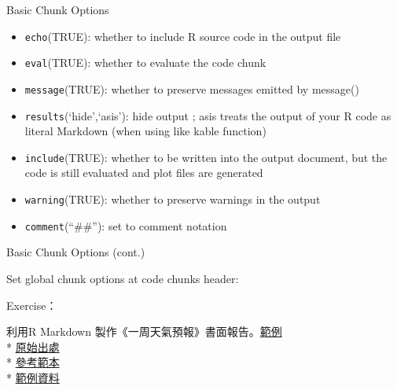 \documentclass[ignorenonframetext,]{beamer}
\newenvironment{Shaded}{\begin{snugshade}}{\end{snugshade}}
\newcommand{\KeywordTok}[1]{\textcolor[rgb]{0.13,0.29,0.53}{\textbf{#1}}}
\newcommand{\DataTypeTok}[1]{\textcolor[rgb]{0.13,0.29,0.53}{#1}}
\newcommand{\StringTok}[1]{\textcolor[rgb]{0.31,0.60,0.02}{#1}}
\newcommand{\OtherTok}[1]{\textcolor[rgb]{0.56,0.35,0.01}{#1}}
\newcommand{\OperatorTok}[1]{\textcolor[rgb]{0.81,0.36,0.00}{\textbf{#1}}}
\newcommand{\NormalTok}[1]{#1}
\providecommand{\tightlist}{%
  \setlength{\itemsep}{0pt}\setlength{\parskip}{0pt}}
\begin{document}
\begin{frame}[fragile]{Basic Chunk Options}

\begin{itemize}
\tightlist
\item
  \texttt{echo}(TRUE): whether to include R source code in the output
  file\\
\item
  \texttt{eval}(TRUE): whether to evaluate the code chunk\\
\item
  \texttt{message}(TRUE): whether to preserve messages emitted by
  message()\\
\item
  \texttt{results}(`hide',`asis'): hide output ; asis treats the output
  of your R code as literal Markdown (when using like kable function)\\
\item
  \texttt{include}(TRUE): whether to be written into the output
  document, but the code is still evaluated and plot files are
  generated\\
\item
  \texttt{warning}(TRUE): whether to preserve warnings in the output
\item
  \texttt{comment}(``\#\#''): set to comment notation
\end{itemize}

\end{frame}

\begin{frame}[fragile]{Basic Chunk Options (cont.)}

Set global chunk options at code chunks header:

\begin{Shaded}
\end{Shaded}

\end{frame}

\begin{frame}{Exercise：}

利用R Markdown
製作《一周天氣預報》書面報告。\href{https://dspim.github.io/A1-basic-data-analysis/RMD-example/RmdExAns.html}{範例}\\
*
\href{http://www.cwb.gov.tw/V7/forecast/taiwan/Taipei_City.htm}{原始出處}\\
*
\href{https://github.com/dspim/a1-basic-data-analysis-course/blob/master/RmdExQue.Rmd}{參考範本}\\
*
\href{https://github.com/dspim/a1-basic-data-analysis-course/blob/master/data/weather-utf8.csv}{範例資料}

\end{frame}
\end{document}
